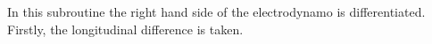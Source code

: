 %
In this subroutine the right hand side of the electrodynamo is differentiated.
%
Firstly, the longitudinal difference is taken. 
%
\begin{equation}
  
\end{equation}
%
%

%
